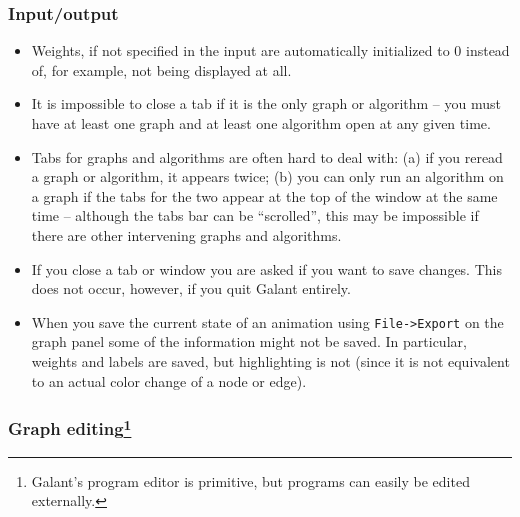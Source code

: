 
\subsubsection*{Input/output}

\begin{itemize}

\item
Weights, if not specified in the input are automatically initialized to 0 instead of, for example, not being displayed at all.

\item
It is impossible to close a tab if it is the only graph or
algorithm -- you must have at least one graph and at least one algorithm open
at any given time.

\item
Tabs for graphs and algorithms are often hard to deal with: (a) if you reread
a graph or algorithm, it appears twice; (b) you can only run an algorithm on a graph if the tabs for the two appear at the top of the window at the same time
-- although the tabs bar can be ``scrolled'',
this may be impossible if there are other intervening graphs and algorithms.

\item
If you close a tab or window you are asked if you want to save changes.
This does not occur, however, if you quit Galant entirely.

\item
When you save the current state of an animation using \texttt{File->Export}
on the graph panel some of the information might not be saved.
In particular, weights and labels are saved, but highlighting is not (since it is not equivalent to an actual color change of a node or edge).

\end{itemize}

\subsubsection*{Graph editing\footnote{
Galant's program editor  is primitive, but
programs can easily be edited externally.}}

